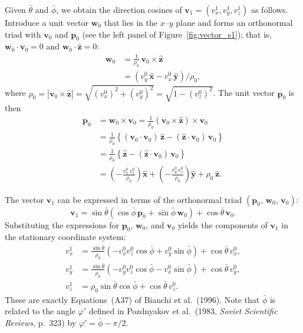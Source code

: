 \documentclass[english,a4paper]{my_memo}
\begin{document}
Given $\bar\theta$ and $\bar\phi$, we obtain the direction cosines
of $\boldsymbol{v}_{1} = (v_{x}^{1}, v_{y}^{1}, v_{z}^{1})$ as
follows. Introduce a unit vector $\mathbf{w}_{0}$ that lies in the
$x$--$y$ plane and forms an orthonormal triad with $\boldsymbol{v}_{0}$
and $\mathbf{p}_{0}$ (see the left panel of
Figure~\ref{fig:vector_s1}); that is,
$\mathbf{w}_{0}\!\cdot\!\boldsymbol{v}_{0}=0$ and
$\mathbf{w}_{0}\!\cdot\!\hat{\mathbf{z}}=0$:
\begin{align*}
\mathbf{w}_{0} & = \frac{1}{\rho_{0}}\,\boldsymbol{v}_{0}\times\hat{\mathbf{z}}\\
& = \left(v_{y}^{0}\,\hat{\mathbf{x}} - v_{x}^{0}\,\hat{\mathbf{y}}\right)/\rho_{0},
\end{align*}
where
$\rho_{0}=|\boldsymbol{v}_{0}\times\hat{\mathbf{z}}|=\sqrt{(v_{x}^{0})^{2}+(v_{y}^{0})^{2}}=\sqrt{1-(v_{z}^{0})^{2}}$.
The unit vector $\mathbf{p}_{0}$ is then
\begin{align*}
\mathbf{p}_{0} & = \mathbf{w}_{0}\times\boldsymbol{v}_{0}
   = \frac{1}{\rho_{0}}\!\left(\boldsymbol{v}_{0}\times\hat{\mathbf{z}}\right)\times\boldsymbol{v}_{0}\\
& = \frac{1}{\rho_{0}}\!\left\{(\boldsymbol{v}_{0}\!\cdot\!\boldsymbol{v}_{0})\,\hat{\mathbf{z}} - (\hat{\mathbf{z}}\!\cdot\!\boldsymbol{v}_{0})\,\boldsymbol{v}_{0}\right\}\\
& = \frac{1}{\rho_{0}}\!\left\{\hat{\mathbf{z}} - (\hat{\mathbf{z}}\!\cdot\!\boldsymbol{v}_{0})\,\boldsymbol{v}_{0}\right\}\\
& = \left(-\frac{v_{x}^{0}\,v_{z}^{0}}{\rho_{0}}\right)\hat{\mathbf{x}} + \left(-\frac{v_{y}^{0}\,v_{z}^{0}}{\rho_{0}}\right)\hat{\mathbf{y}} + \rho_{0}\,\hat{\mathbf{z}}.
\end{align*}

The vector $\boldsymbol{v}_{1}$ can be expressed in terms of the
orthonormal triad $(\mathbf{p}_{0},\,\mathbf{w}_{0},\,\boldsymbol{v}_{0})$:
\[
\boldsymbol{v}_{1} = \sin\bar{\theta}\!\left(\cos\bar{\phi}\,\mathbf{p}_{0} + \sin\bar{\phi}\,\mathbf{w}_{0}\right) + \cos\bar{\theta}\,\boldsymbol{v}_{0}.
\]
Substituting the expressions for $\mathbf{p}_{0}$,
$\mathbf{w}_{0}$, and $\boldsymbol{v}_{0}$ yields the components of
$\boldsymbol{v}_{1}$ in the stationary coordinate system:
\begin{align*}
v_{x}^{1} & = \frac{\sin\bar{\theta}}{\rho_{0}}\!\left(-v_{x}^{0}v_{z}^{0}\cos\bar{\phi} + v_{y}^{0}\sin\bar{\phi}\right) + \cos\bar{\theta}\,v_{x}^{0},\\
v_{y}^{1} & = \frac{\sin\bar{\theta}}{\rho_{0}}\!\left(-v_{y}^{0}v_{z}^{0}\cos\bar{\phi} - v_{x}^{0}\sin\bar{\phi}\right) + \cos\bar{\theta}\,v_{y}^{0},\\
v_{z}^{1} & = \rho_{0}\sin\bar{\theta}\cos\bar{\phi} + \cos\bar{\theta}\,v_{z}^{0}.
\end{align*}
These are exactly Equations~(A37) of Bianchi et al.\ (1996). Note
that $\bar\phi$ is related to the angle $\varphi'$ defined in
Pozdnyakov et al.\ (1983, \textit{Soviet Scientific Reviews},
p.~323) by $\varphi' = \bar\phi - \pi/2$.
\end{document}
